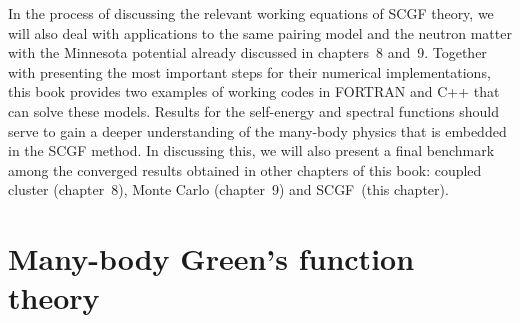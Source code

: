 In the process of discussing the relevant working equations  of SCGF theory, we will also deal with applications to the same pairing model and the neutron matter with the Minnesota potential already discussed in chapters~8 and~9.  Together with presenting the most important steps for their numerical implementations, this book provides two examples of working codes in FORTRAN and C++ that can solve these models.  Results for the self-energy and spectral functions  should serve to gain a deeper understanding of the many-body physics that is embedded in the SCGF method.
 In discussing this, we will also present a final benchmark among the converged results obtained in other chapters of this book: coupled cluster (chapter~8),  Monte Carlo (chapter~9)  and SCGF~(this chapter).

%


\section{Many-body Green's function theory}
\label{sec:scgf_defs}

 

